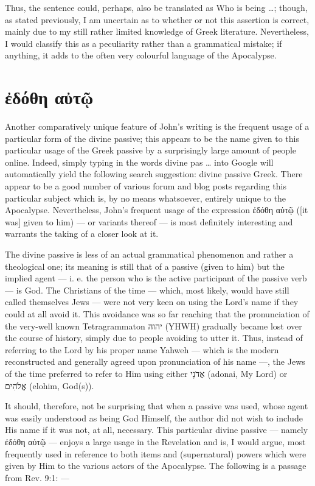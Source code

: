 Thus, the sentence could, perhaps, also be translated as Who is being …; though, as stated previously, I am uncertain as to whether or not this assertion is correct, mainly due to my still rather limited knowledge of Greek literature. Nevertheless, I would classify this as a peculiarity rather than a grammatical mistake; if anything, it adds to the often very colourful language of the Apocalypse.

\section*{ἐδόθη αὐτῷ}
Another comparatively unique feature of John’s writing is the frequent usage of a particular form of the divine passive; this appears to be the name given to this particular usage of the Greek passive by a surprisingly large amount of people online. Indeed, simply typing in the words divine pas … into Google will automatically yield the following search suggestion: divine passive Greek. There appear to be a good number of various forum and blog posts regarding this particular subject which is, by no means whatsoever, entirely unique to the Apocalypse. Nevertheless, John’s frequent usage of the expression ἐδόθη αὐτῷ ([it was] given to him) — or variants thereof — is most definitely interesting and warrants the taking of a closer look at it.

The divine passive is less of an actual grammatical phenomenon and rather a theological one; its meaning is still that of a passive (given to him) but the implied agent — i. e. the person who is the active participant of the passive verb — is God. The Christians of the time — which, most likely, would have still called themselves Jews — were not very keen on using the Lord’s name if they could at all avoid it. This avoidance was so far reaching that the pronunciation of the very-well known Tetragrammaton יהוה‎ (YHWH) gradually became lost over the course of history, simply due to people avoiding to utter it. Thus, instead of referring to the Lord by his proper name Yahweh — which is the modern reconstructed and generally agreed upon pronunciation of his name —, the Jews of the time preferred to refer to Him using either אֲדֹנָי‎ (adonai, My Lord) or אֱלֹהִים‎ (elohim, God(s)).

It should, therefore, not be surprising that when a passive was used, whose agent was easily understood as being God Himself, the author did not wish to include His name if it was not, at all, necessary. This particular divine passive — namely ἐδόθη αὐτῷ — enjoys a large usage in the Revelation and is, I would argue, most frequently used in reference to both items and (supernatural) powers which were given by Him to the various actors of the Apocalypse. The following is a passage from Rev. 9:1: —

